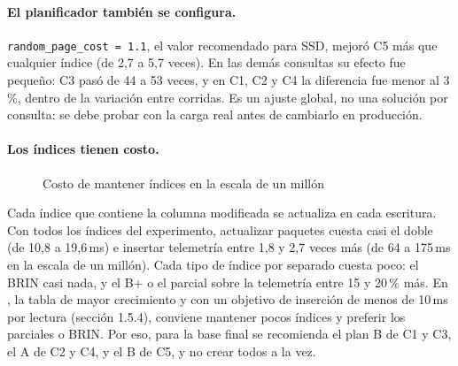 \paragraph{El planificador también se configura.} \texttt{random\_page\_cost = 1.1}, el valor recomendado para SSD, mejoró C5 más que cualquier índice (de 2,7 a 5,7 veces). En las demás consultas su efecto fue pequeño: C3 pasó de 44 a 53 veces, y en C1, C2 y C4 la diferencia fue menor al 3\,\%, dentro de la variación entre corridas. Es un ajuste global, no una solución por consulta: se debe probar con la carga real antes de cambiarlo en producción.

\paragraph{Los índices tienen costo.}
\begin{figure}[H]\centering{}\caption{Costo de mantener índices en la escala de un millón}\end{figure}
Cada índice que contiene la columna modificada se actualiza en cada escritura. Con todos los índices del experimento, actualizar paquetes cuesta casi el doble (de 10,8 a 19,6\,ms) e insertar telemetría entre 1,8 y 2,7 veces más (de 64 a 175\,ms en la escala de un millón). Cada tipo de índice por separado cuesta poco: el BRIN casi nada, y el B+ o el parcial sobre la telemetría entre 15 y 20\,\% más.
En , la tabla de mayor crecimiento y con un objetivo de inserción de menos de 10\,ms por lectura (sección 1.5.4), conviene mantener pocos índices y preferir los parciales o BRIN. Por eso, para la base final se recomienda el plan B de C1 y C3, el A de C2 y C4, y el B de C5, y no crear todos a la vez.

